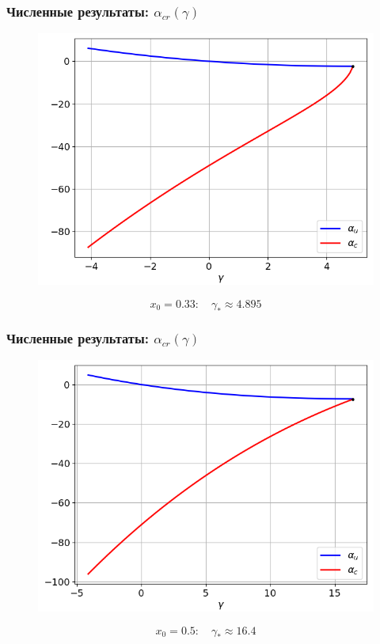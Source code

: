 \documentclass[fullscreen=true, unicode, bookmarks=false]{beamer}
\begin{document}
\begin{frame}
\frametitle{ Численные результаты: $ \alpha_{cr}(\gamma) $ }

\begin{figure} 
\includegraphics[scale=0.55]{alphas_13.png}  
\end{figure}

$$ x_0 = 0.33: \quad \gamma_* \approx 4.895 $$

\end{frame}

\begin{frame}
\frametitle{ Численные результаты: $ \alpha_{cr}(\gamma) $ }

\begin{figure} 
\includegraphics[scale=0.55]{alphas_12.png}  
\end{figure}

$$ x_0 = 0.5: \quad \gamma_* \approx 16.4 $$

\end{frame}
\end{document}
